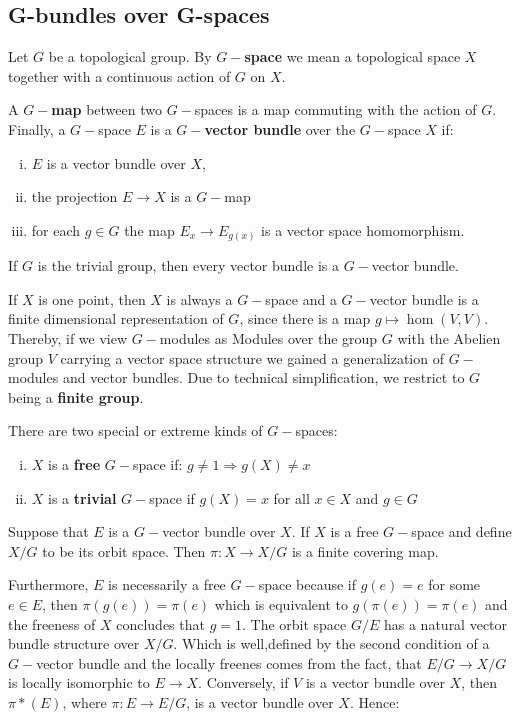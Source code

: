 \subsection{G-bundles over G-spaces}
\begin{definition}[G-space]
	Let $G$ be a topological group. By \textbf{$G-$space} we mean a topological space $X$ together with a continuous action of $G$ on $X$.
	
	A $G-$\textbf{map} between two $G-$spaces is a map commuting with the action of $G$. Finally, 
	a $G-$space $E$ is a \textbf{$G-$vector bundle }over the $G-$space $X$ if:
	\begin{enumerate}[(i)]
		\item $E$ is a vector bundle over $X$,
		\item the projection $E\to X$ is a $G-$map
		\item for each $g\in G$ the map $E_x\to E_{g(x)}$ is a vector space homomorphism.
	\end{enumerate}
\end{definition}
\begin{example}
	If $G$ is the trivial group, then every vector bundle is a $G-$vector bundle.
	
	If $X$ is one point, then $X$ is always a $G-$space and a $G-$vector bundle is a finite dimensional representation of $G$, since there is a map $g\mapsto \hom(V,V)$.
	Thereby, if we view $G-$modules as Modules over the group $G$ with the Abelien group $V$ carrying a vector space structure we gained a generalization of $G-$modules and vector bundles. Due to technical simplification, we restrict to $G$ being a \textbf{finite group}.
\end{example}
\begin{definition}
	There are two special or extreme kinds of $G-$spaces:
	\begin{enumerate}[(i)]
		\item $X$ is a \textbf{free} $G-$space if: $g\neq 1\Rightarrow g(X)\neq x$
		\item $X$ is a \textbf{trivial} $G-$space if $g(X)=x$ for all $x\in X$ and $g\in G$
	\end{enumerate}
\end{definition}
\begin{cor} Suppose that $E$ is a $G-$vector bundle over $X$.
	If $X$ is a free $G-$space and define $X\slash G$ to be its orbit space. Then $\pi: X\to X\slash G$ is a finite covering map. 
	
	
	Furthermore, $E$ is necessarily a free $G-$space because if $g(e)=e$ for some $e\in E$, then $\pi(g(e))=\pi(e)$ which is equivalent to $g(\pi(e))=\pi(e)$ and the freeness of $X$ concludes that $g=1$. The orbit space $G\slash E$ has a natural vector bundle structure over $X\slash G$. Which is well,defined by the second condition of a $G-$vector bundle and the locally freenes comes from the fact, that $E\slash G \to X\slash G$ is locally isomorphic to $E\to X$. Conversely, if $V$ is a vector bundle over $X$, then $\pi*(E)$, where $\pi: E\to E\slash G$, is a vector bundle over $X$. Hence:
\end{cor}
